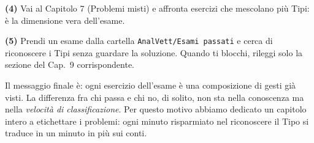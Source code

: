 \documentclass[11pt,a4paper,openany]{book}
\theoremstyle{plain}
\theoremstyle{definition}
\theoremstyle{remark}
\begin{document}
\textbf{(4)} Vai al Capitolo 7 (Problemi misti) e affronta esercizi che
mescolano pi\`u Tipi: \`e la dimensione vera dell'esame.

\textbf{(5)} Prendi un esame dalla cartella \texttt{AnalVett/Esami passati}
e cerca di riconoscere i Tipi senza guardare la soluzione. Quando ti
blocchi, rileggi solo la sezione del Cap.~9 corrispondente.

Il messaggio finale \`e: ogni esercizio dell'esame \`e una composizione
di gesti gi\`a visti. La differenza fra chi passa e chi no, di solito,
non sta nella conoscenza ma nella \emph{velocit\`a di classificazione}.
Per questo motivo abbiamo dedicato un capitolo intero a etichettare i
problemi: ogni minuto risparmiato nel riconoscere il Tipo si traduce
in un minuto in pi\`u sui conti.
\end{document}
